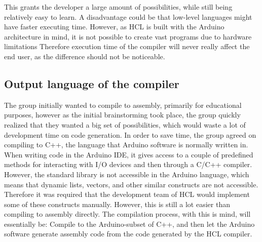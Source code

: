This grants the developer a large amount of possibilities, while still being relatively easy to learn.
A disadvantage could be that low-level languages might have faster executing time. 
However, as HCL is built with the Arduino architecture in mind, it is not possible to create vast programs due to hardware limitations
Therefore execution time of the compiler will never really affect the end user, as the difference should not be noticeable.

\subsection{Output language of the compiler}
The group initially wanted to compile to assembly, primarily for educational purposes, however as the initial brainstorming took place, the group quickly realized that they wanted a big set of possibilities, which would waste a lot of development time on code generation. 
In order to save time, the group agreed on compiling to C++, the language that Arduino software is normally written in.
When writing code in the Arduino IDE, it gives access to a couple of predefined methods for interacting with I/O devices and then through a C/C++ compiler\cite{ArFAQ}.
However, the standard library is not accessible in the Arduino language, which means that dynamic lists, vectors, and other similar constructs are not accessible.
Therefore it was required that the development team of HCL would implement some of these constructs manually.
However, this is still a lot easier than compiling to assembly directly. 
The compilation process, with this is mind, will essentially be: Compile to the Arduino-subset of C++, and then let the Arduino software generate assembly code from the code generated by the HCL compiler.
